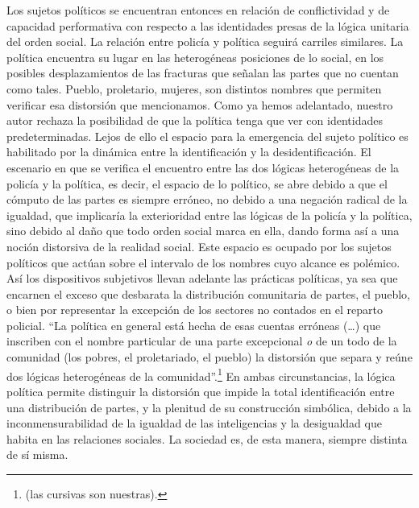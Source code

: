 Los sujetos políticos se encuentran entonces en relación de conflictividad y de capacidad performativa con respecto a las identidades presas de la lógica unitaria del orden social. La relación entre policía y política seguirá carriles similares. La política encuentra su lugar en las heterogéneas posiciones de lo social, en los posibles desplazamientos de las fracturas que señalan las partes que no cuentan como tales. Pueblo, proletario, mujeres, son distintos nombres que permiten verificar esa distorsión que mencionamos. Como ya hemos adelantado, nuestro autor rechaza la posibilidad de que la política tenga que ver con identidades predeterminadas. Lejos de ello el espacio para la emergencia del sujeto político es habilitado por la dinámica entre la identificación y la desidentificación. El escenario en que se verifica el encuentro entre las dos lógicas heterogéneas de la policía y la política, es decir, el espacio de lo político, se abre debido a que el cómputo de las partes es siempre erróneo, no debido a una negación radical de la igualdad, que implicaría la exterioridad entre las lógicas de la policía y la política, sino debido al daño que todo orden social marca en ella, dando forma así a una noción distorsiva de la realidad social. Este espacio es ocupado por los sujetos políticos que actúan sobre el intervalo de los nombres cuyo alcance es polémico. Así los dispositivos subjetivos llevan adelante las prácticas políticas, ya sea que encarnen el exceso que desbarata la distribución comunitaria de partes, el pueblo, o bien por representar la excepción de los sectores no contados en el reparto policial. \enquote{La política en general está hecha de esas cuentas erróneas (\ldots)  que inscriben con el nombre particular de una parte excepcional \emph{o} de un todo de la comunidad (los pobres, el proletariado, el pueblo) la distorsión que separa y reúne dos lógicas heterogéneas de la comunidad}.\footnote{\cite[][56]{@7064-RANCIERE2010} (las cursivas son nuestras).} En ambas circunstancias, la lógica política permite distinguir la distorsión que impide la total identificación entre una distribución de partes, y la plenitud de su construcción simbólica, debido a la inconmensurabilidad de la igualdad de las inteligencias y la desigualdad que habita en las relaciones sociales. La sociedad es, de esta manera, siempre distinta de sí misma.

